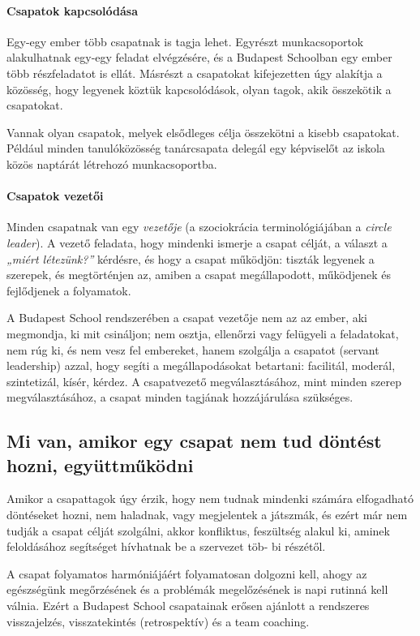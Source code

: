 \hypertarget{csapatok-kapcsolodasa}{%
\paragraph{Csapatok kapcsolódása}\label{csapatok-kapcsolodasa}}

Egy-egy ember több csapatnak is tagja lehet. Egyrészt munkacsoportok
alakulhatnak egy-egy feladat elvégzésére, és a Budapest Schoolban egy
ember több részfeladatot is ellát. Másrészt a csapatokat kifejezetten
úgy alakítja a közösség, hogy legyenek köztük kapcsolódások, olyan
tagok, akik összekötik a csapatokat.

Vannak olyan csapatok, melyek elsődleges célja összekötni a kisebb
csapatokat. Például minden tanulóközösség tanárcsapata delegál egy
képviselőt az iskola közös naptárát létrehozó munkacsoportba.

\hypertarget{csapatok-vezetoi}{%
\paragraph{Csapatok vezetői}\label{csapatok-vezetoi}}

Minden csapatnak van egy \emph{vezetője} (a szociokrácia\break
terminológiájában a
\emph{circle leader}). A vezető feladata, hogy mindenki ismerje a csapat
célját, a választ a \emph{„miért létezünk?''} kérdésre, és hogy a csapat
működjön: tiszták legyenek a szerepek, és megtörténjen az, amiben
a csapat megállapodott, működjenek és fejlődjenek a folyamatok.

A Budapest School rendszerében a csapat vezetője nem az az ember, aki megmondja,
ki mit csináljon; nem osztja, ellenőrzi vagy felügyeli a feladatokat,
nem rúg ki, és nem vesz fel embereket, hanem szolgálja a csapatot
(servant leadership) azzal, hogy segíti a megállapodásokat betartani:
facilitál, moderál, szintetizál, kísér, kérdez. A csapatvezető
megválasztásához, mint minden szerep megválasztásához, a csapat minden
tagjának hozzájárulása szükséges.

\hypertarget{mi-van-amikor-egy-csapat-nem-tud-dontest-hozni-egyuttmukodni}{%
\subsection{Mi van, amikor egy csapat nem tud döntést hozni,
együttműködni}\label{mi-van-amikor-egy-csapat-nem-tud-dontest-hozni-egyuttmukodni}}

Amikor a csapattagok úgy érzik, hogy nem tudnak mindenki számára
elfogadható döntéseket hozni, nem haladnak, vagy megjelentek a játszmák,
és ezért már nem tudják a csapat célját szolgálni, akkor konfliktus,
feszültség alakul ki, aminek feloldásához segítséget hívhatnak be a
szervezet töb-\break
bi részétől.

A csapat folyamatos harmóniájáért folyamatosan dolgozni kell, ahogy az
egészségünk megőrzésének és a problémák megelőzésének is napi rutinná kell
válnia. Ezért a Budapest School csapatainak erősen ajánlott a
rendszeres visszajelzés, visszatekintés (retrospektív) és a team
coaching.
